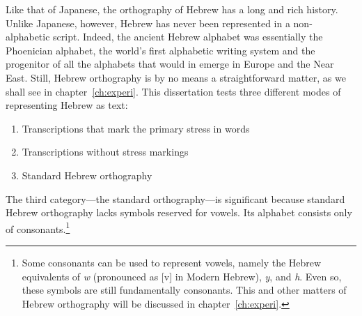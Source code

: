 \begin{definition}
Like that of Japanese, the orthography of Hebrew has a long and rich history. Unlike Japanese, however, Hebrew has never been represented in a non-alphabetic script. Indeed, the ancient Hebrew alphabet was essentially the Phoenician alphabet, the world's first alphabetic writing system and the progenitor of all the alphabets that would in emerge in Europe and the Near East. Still, Hebrew orthography is by no means a straightforward matter, as we shall see in chapter~\ref{ch:experi}.
This dissertation tests three different modes of representing Hebrew as text:
\begin{enumerate}
\item Transcriptions that mark the primary stress in words
\item Transcriptions without stress markings 
\item Standard Hebrew orthography 
\end{enumerate} 
The third category---the standard orthography---is significant because standard Hebrew 
orthography lacks symbols reserved for vowels. Its alphabet consists only of consonants.\footnote{Some consonants can be used to represent vowels, namely the Hebrew equivalents of \textit{w} (pronounced as [v] in Modern Hebrew), \textit{y}, and \textit{h}. Even so, these symbols are still fundamentally consonants. This and other matters of Hebrew orthography will be discussed in chapter~\ref{ch:experi}.}


\end{definition}
